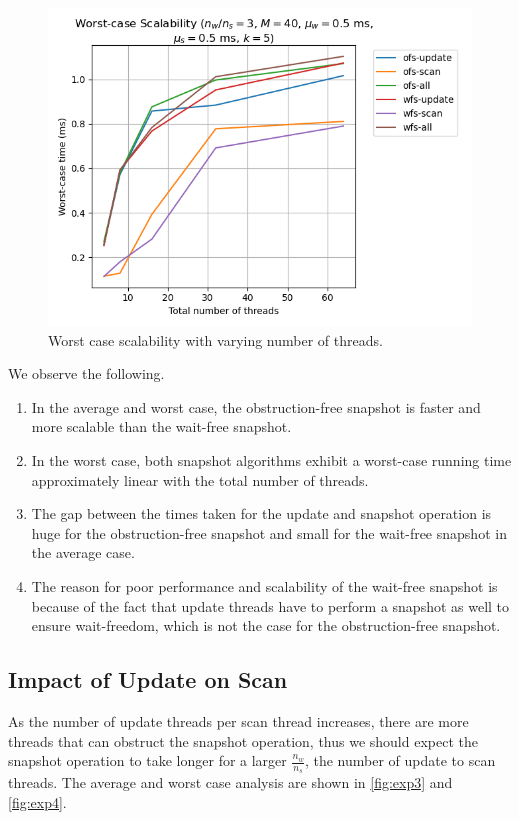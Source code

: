 \documentclass[conference,compsoc]{IEEEtran}
\begin{document}
\begin{figure}[!ht]
    \centering
    \includegraphics[width=\columnwidth]{images/exp2.png}
    \caption{Worst case scalability with varying number of threads.}
    \label{fig:exp2}
\end{figure}

We observe the following.
\begin{enumerate}
    \item In the average and worst case, the obstruction-free snapshot is faster
    and more scalable than the wait-free snapshot.
    \item In the worst case, both snapshot algorithms exhibit a worst-case
    running time approximately linear with the total number of threads.
    \item The gap between the times taken for the update and snapshot operation
    is huge for the obstruction-free snapshot and small for the wait-free
    snapshot in the average case.
    \item The reason for poor performance and scalability of the wait-free
    snapshot is because of the fact that update threads have to perform a
    snapshot as well to ensure wait-freedom, which is not the case for the
    obstruction-free snapshot.
\end{enumerate}

\subsection{Impact of Update on Scan}
\label{susbec:impact-update-scan}

As the number of update threads per scan thread increases, there are more
threads that can obstruct the snapshot operation, thus we should expect the
snapshot operation to take longer for a larger \(\frac{n_w}{n_s}\), the number
of update to scan threads. The average and worst case analysis are shown in
\autoref{fig:exp3} and \autoref{fig:exp4}.
\end{document}

